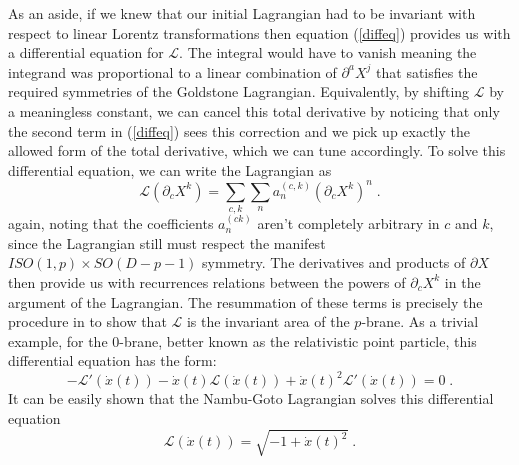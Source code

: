 \documentclass[%
 reprint,
 amsmath,amssymb,
 aps,
]{revtex4-1}
\begin{document}
As an aside, if we knew that our initial Lagrangian had to be invariant with respect to linear Lorentz transformations
then equation (\ref{diffeq}) provides us with a differential equation for $\mathcal{L}$.  The integral would have to
vanish meaning the integrand was proportional to a linear combination of $\partial^a X^j$ that satisfies the required symmetries
of the Goldstone Lagrangian.  Equivalently, by shifting $\mathcal{L}$ by a
meaningless constant, we can cancel this total derivative by noticing that only the second term in (\ref{diffeq}) sees
this correction and we pick up exactly the allowed form of the total derivative, which we can tune accordingly.
To solve this differential equation, we can write the Lagrangian as
\begin{equation}
    \mathcal{L}(\partial_c X^k) = \sum_{c, k} \sum_n a^{(c, k)}_n (\partial_c X^k)^n \; . \nonumber
\end{equation}
again, noting that the coefficients $a_n^{(c k)}$ aren't completely arbitrary in $c$ and $k$, since the Lagrangian still must
respect the manifest $ISO(1,p) \times SO(D-p-1)$ symmetry. The derivatives and products of $\partial X$ then provide us with
recurrences relations between the powers of $\partial_c X^k$ in the argument of the Lagrangian. The resummation of these terms
is precisely the procedure in \cite{Gliozzi:2012cx} to show that $\mathcal{L}$ is the invariant area of the $p$-brane.
As a trivial example, for the $0$-brane, better known as the relativistic point particle, this differential equation has the form:
\begin{equation}
    -\mathcal{L}'(\dot{x}(t)) - \dot{x}(t) \mathcal{L}(\dot{x}(t)) + \dot{x}(t)^2 \mathcal{L}'(\dot{x}(t)) = 0 \; . \nonumber
\end{equation}
It can be easily shown that the Nambu-Goto Lagrangian solves this differential equation
\begin{equation}
    \mathcal{L}(\dot{x}(t)) = \sqrt{-1 + \dot{x}(t)^2} \; . \nonumber
\end{equation}


\end{document}

